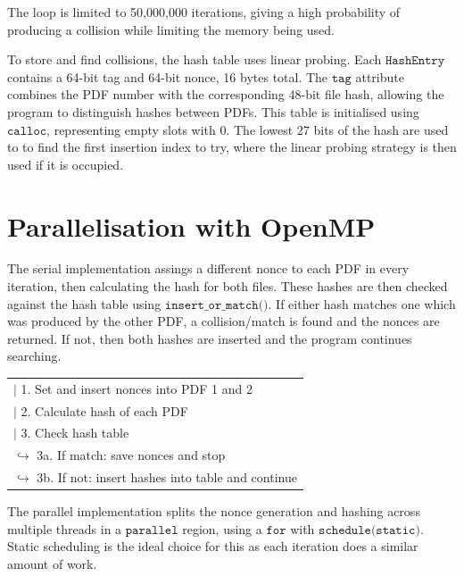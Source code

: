 \documentclass[11pt,a4paper]{article}
\begin{document}
The loop is limited to 50,000,000 iterations, giving a high probability of producing 
a collision while limiting the memory being used.

To store and find collisions, the hash table uses linear probing. Each $\texttt{HashEntry}$ 
contains a 64-bit tag and 64-bit nonce, 16 bytes total. The $\texttt{tag}$ attribute combines 
the PDF number with the corresponding 48-bit file hash, allowing the program to distinguish 
hashes between PDFs. This table is initialised using $\texttt{calloc}$, representing empty 
slots with 0. The lowest 27 bits of the hash are used to to find the first insertion index 
to try, where the linear probing strategy is then used if it is occupied.

\section{Parallelisation with OpenMP}

The serial implementation assings a different nonce to each PDF in 
every iteration, then calculating the hash for both files. These hashes 
are then checked against the hash table using $\texttt{insert\_or\_match()}$. 
If either hash matches one which was produced by the other PDF, a collision/match 
is found and the nonces are returned. If not, then both hashes are inserted and 
the program continues searching.

\begin{center}
    \begin{tabular}{l}
        $\mid$ 1. Set and insert nonces into PDF 1 and 2\\
        $\mid$ 2. Calculate hash of each PDF\\
        $\mid$ 3. Check hash table\\
        $\hookrightarrow$ 3a. If match: save nonces and stop\\
        $\hookrightarrow$ 3b. If not: insert hashes into table and continue
    \end{tabular}
\end{center}

The parallel implementation splits the nonce generation and hashing across multiple 
threads in a $\texttt{parallel}$ region, using a $\texttt{for}$ with $\texttt{schedule(static)}$. 
Static scheduling is the ideal choice for this as each iteration does a similar amount of work.
\end{document}
